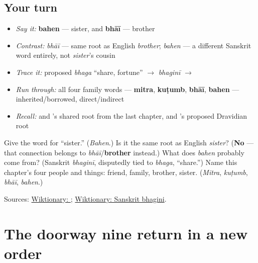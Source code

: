 \subsection*{Your turn}
\begin{itemize}
\raggedright
  \item \emph{Say it:} \textbf{bahen} — sister, and \textbf{bhāī} — brother
  \item \emph{Contrast:} \emph{bhāī} — same root as English \emph{brother}; \emph{bahen} — a different Sanskrit word entirely, not \emph{sister}'s cousin
  \item \emph{Trace it:} proposed \emph{bhaga} \textquotedblleft{}share, fortune\textquotedblright{} $\to$ \emph{bhaginī} $\to$ \textbf{}
  \item \emph{Run through:} all four family words — \textbf{mitra}, \textbf{kuṭumb}, \textbf{bhāī}, \textbf{bahen} — inherited/borrowed, direct/indirect
  \item \emph{Recall:} \textbf{} and \textbf{}'s shared root from the last chapter, and \textbf{}'s proposed Dravidian root
\end{itemize}

\begin{tcolorbox}[breakable,colback=teal!4,colframe=teal!35!black,title={Before you move on}]
Give the word for \textquotedblleft{}sister.\textquotedblright{} (\emph{Bahen}.) Is it the same root as English \emph{sister}? (\textbf{No} — that connection belongs to \emph{bhāī}/\textbf{brother} instead.) What does \emph{bahen} probably come from? (Sanskrit \emph{bhaginī}, disputedly tied to \emph{bhaga}, \textquotedblleft{}share.\textquotedblright{}) Name this chapter's four people and things: friend, family, brother, sister. (\emph{Mitra}, \emph{kuṭumb}, \emph{bhāī}, \emph{bahen}.)

Sources: \href{https://en.wiktionary.org/wiki/\%E0\%AA\%AC\%E0\%AA\%B9\%E0\%AB\%87\%E0\%AA\%A8}{Wiktionary: }; \href{https://en.wiktionary.org/wiki/\%E0\%A4\%AD\%E0\%A4\%97\%E0\%A4\%BF\%E0\%A4\%A8\%E0\%A5\%80}{Wiktionary: Sanskrit bhagini}.
\end{tcolorbox}
\section[retroflex nna — ja — u sign — sha …]{The doorway nine return in a new order}

\label{lesson:GU-R13-doorway-nine-r3}



